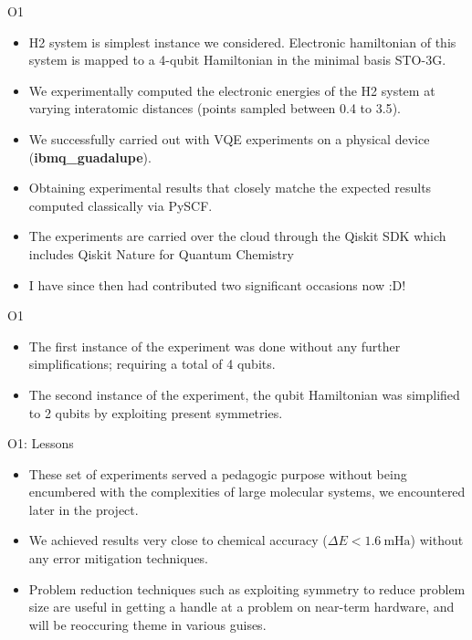 \begin{frame}{O1}
  \begin{itemize}
    \setlength\itemsep{0.1em}
    \item H2 system is simplest instance we considered. Electronic hamiltonian of this system is mapped to a 4-qubit Hamiltonian in the minimal basis STO-3G.
    \item We experimentally computed the electronic energies of the H2 system at varying interatomic distances (points sampled between {\color{teal}0.4 to 3.5}).
    \item We successfully carried out with VQE experiments on a physical device (\textbf{ibmq\_guadalupe}).
    \item Obtaining experimental results that closely matche the expected results computed classically via PySCF.
    \item The experiments are carried over the cloud through the Qiskit SDK which includes Qiskit Nature for Quantum Chemistry
    \item I have since then had contributed two significant occasions now :D!
  \end{itemize}
\end{frame}

\begin{frame}{O1}
  \begin{itemize}
    \setlength\itemsep{0.1em}
    \item The first instance of the experiment was done without any further simplifications; requiring a total of 4 qubits.
    \item The second instance of the experiment, the qubit Hamiltonian was simplified to 2 qubits by exploiting present symmetries.
  \end{itemize}
\end{frame}

\begin{frame}{O1: Lessons}
  \begin{itemize}
    \setlength\itemsep{0.1em}
    \item These set of experiments served a pedagogic purpose without being encumbered with the complexities of large molecular systems,
          we encountered later in the project.
    \item We achieved results very close to {\color{red}chemical accuracy ($\Delta E < 1.6 \>\text{mHa}$)} without any error mitigation
          techniques.
    \item Problem reduction techniques such as exploiting symmetry to reduce problem size
          are useful in getting a handle at a problem on near-term hardware, and will be reoccuring theme in various guises.
  \end{itemize}
\end{frame}


